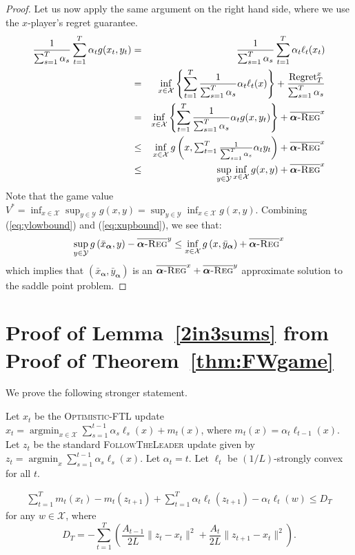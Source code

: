 \documentclass[final,12pt]{colt2018} %
\def\argmin{\mathop{\arg\min}}
\def\balpha{\boldsymbol{\alpha}}
\def\FTL{\textsc{FollowTheLeader}\xspace}
\def\OFTL{\textsc{Optimistic-FTL}\xspace}
\newcommand{\avgregret}[1]{\overline{\balpha\textsc{-Reg}}^{#1}}
\newcommand{\XX}{\mathcal{X}}
\newcommand{\YY}{\mathcal{Y}}
\newcommand{\pr}[1]{\left(#1\right)}
\begin{document}
\begin{proof}
Let us now apply the same argument on the right hand side, where we use the $x$-player's regret guarantee.
\begin{eqnarray}
\frac{1}{\sum_{s=1}^T \alpha_s}  \sum_{t=1}^T  \alpha_t g(x_t, y_t) & = & \frac{1}{\sum_{s=1}^T \alpha_s} \sum_{t=1}^T  \alpha_t \ell_t(x_t) \notag \\
  & = & \inf_{x \in \XX} \left\{ 
    \sum_{t=1}^T \frac{1}{\sum_{s=1}^T \alpha_s} \alpha_t \ell_t(x) \right \} + \frac{ \text{Regret}_T^x }{  \sum_{s=1}^T \alpha_s }  \notag \\
  & = & \inf_{x \in \XX} \left\{  \sum_{t=1}^T \frac{1}{\sum_{s=1}^T \alpha_s} \alpha_t g(x, y_t) \right \} + \avgregret{x} \notag \\
  & \leq & \inf_{x \in \XX}  
    g\left(x,{ \textstyle \sum_{t=1}^T \frac{1}{\sum_{s=1}^T \alpha_s} \alpha_t y_t}\right) + \avgregret{x} 
    \label{eq:xupbound} \\
  & \leq & \sup_{y \in \YY} \inf_{x \in \XX}  g(x,y) + \avgregret{x}  \notag
\end{eqnarray}
Note that the game value $V^{*}= \inf_{x \in \XX} \sup_{y \in \YY} g(x,y) = \sup_{y \in \YY} \inf_{x \in \XX}  g(x,y)$.
Combining (\ref{eq:ylowbound}) and (\ref{eq:xupbound}), we see that:
\begin{align*}
    \sup_{y \in \YY} g\left({\textstyle \bar{x}_{\balpha}}, y \right)  - \avgregret{y}  \le \inf_{x \in \XX}  
g\left(x,{ \textstyle \bar{y}_{\balpha}}\right) + \avgregret{x} 
\end{align*}
which implies that $(\bar{x}_{\balpha}, \bar{y}_{\balpha})$ is an $\avgregret{x} + \avgregret{y} $ approximate solution to the saddle point problem.
\end{proof}


\section{Proof of Lemma~\ref{2in3sums} from Proof of Theorem~\ref{thm:FWgame}} \label{app:2in3sums}
We prove the following stronger statement.
\begin{lemma}\label{2in3sums}	
Let $x_{t}$ be the \OFTL update	$x_t = \argmin_{x \in \XX} \sum_{s=1}^{t-1} \alpha_s \ell_s(x) + m_{t}(x)$,
	where $m_{t}(x) = \alpha_{t} \ell_{{t-1}}(x)$. Let $z_t$ be the standard \FTL update given by $z_t = \argmin_{x} \sum_{s=1}^{t-1} \alpha_s \ell_s(x)$. Let $\alpha_t = t$. Let $\ell_t$ be $(1/L)$-strongly convex for all $t$.
	
	
		
\begin{equation} \label{bound:2sums}
\begin{aligned}
 \sum_{t=1}^{T} m_t(x_t) - m_t(z_{t+1}) + \sum_{t=1}^T \alpha_t \ell_t(z_{t+1}) - \alpha_t \ell_t(w)
 \leq D_T
\end{aligned}
\end{equation}
for any $w \in \XX$, where $$D_T= -\sum_{t=1}^T \pr{\frac{A_{t-1}}{2L} \| z_t - x_t\|^2 
+ \frac{A_{t}}{2L} \| z_{t+1} - x_t\|^2}.$$ 
\end{lemma}
\end{document}
